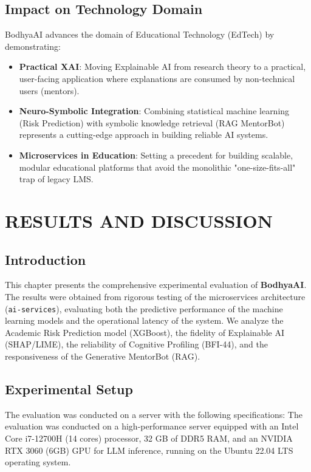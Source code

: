 \documentclass[12pt,a4paper]{report}
\begin{document}
\section{Impact on Technology Domain}
BodhyaAI advances the domain of Educational Technology (EdTech) by demonstrating:
\begin{itemize}
    \item \textbf{Practical XAI}: Moving Explainable AI from research theory to a practical, user-facing application where explanations are consumed by non-technical users (mentors).
    \item \textbf{Neuro-Symbolic Integration}: Combining statistical machine learning (Risk Prediction) with symbolic knowledge retrieval (RAG MentorBot) represents a cutting-edge approach in building reliable AI systems.
    \item \textbf{Microservices in Education}: Setting a precedent for building scalable, modular educational platforms that avoid the monolithic "one-size-fits-all" trap of legacy LMS.
\end{itemize}

\chapter{RESULTS AND DISCUSSION}

\section{Introduction}

This chapter presents the comprehensive experimental evaluation of \textbf{BodhyaAI}. The results were obtained from rigorous testing of the microservices architecture (\texttt{ai-services}), evaluating both the predictive performance of the machine learning models and the operational latency of the system. We analyze the Academic Risk Prediction model (XGBoost), the fidelity of Explainable AI (SHAP/LIME), the reliability of Cognitive Profiling (BFI-44), and the responsiveness of the Generative MentorBot (RAG).

\section{Experimental Setup}

The evaluation was conducted on a server with the following specifications:
The evaluation was conducted on a high-performance server equipped with an Intel Core i7-12700H (14 cores) processor, 32 GB of DDR5 RAM, and an NVIDIA RTX 3060 (6GB) GPU for LLM inference, running on the Ubuntu 22.04 LTS operating system.
\end{document}
